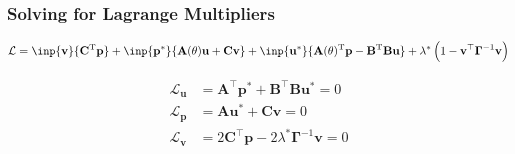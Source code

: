 \documentclass[
  pdf,
  10pt,
  xcolor={svgnames},
]{beamer}
\newcommand{\mbf}[1]{\mathbf{#1}}
\newcommand{\mc}[1]{\mathcal{#1}}
\newcommand{\T}{\mathrm{T}}
\newcommand{\mat}[1]{\mathbf{{#1}}}
\begin{document}
\begin{frame}
  \frametitle{Solving for Lagrange Multipliers}
  \begin{block}{}
    \begin{equation*}
      \mc{L}
      = \inp{\mbf{v}}{\mat{C}^\T \mbf{p}}
      + \inp{\mbf{p}^*}{\mat{A}(\theta)\mbf{u} + \mat{C} \mbf{v}}
      + \inp{\mbf{u}^*}{
        \mat{A}(\theta)^\T \mbf{p} - \mat{B}^\T \mat{B} \mbf{u}
      }
      + \lambda^* \left( 1-\mbf{v}^\top \mat{\Gamma}^{-1} \mbf{v} \right)
    \end{equation*}
  \end{block}
  \begin{align*}
    \mc{L}_\mbf{u}
     & = \mat{A}^\top \mbf{p}^* + \mat{B}^\top\mat{B} \mbf{u}^* = 0       \\
    \mc{L}_\mbf{p}
     & = \mat{A} \mbf{u}^* + \mat{C} \mbf{v} = 0                          \\
    \mc{L}_\mbf{v}
     & = 2\mat{C}^\top \mbf{p} - 2\lambda^* \mat{\Gamma}^{-1} \mbf{v} = 0
  \end{align*}
\end{frame}
\end{document}

